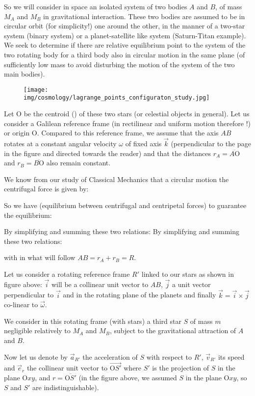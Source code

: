 	So we will consider in space an isolated system of two bodies $A$ and $B$, of mass $M_A$ and $M_B$ in gravitational interaction. These two bodies are assumed to be in circular orbit (for simplicity!) one around the other, in the manner of a two-star system (binary system) or a planet-satellite like system (Saturn-Titan example). We seek to determine if there are relative equilibrium point to the system of the two rotating body for  a third body also in circular motion in the same plane (of sufficiently low mass to avoid disturbing the motion of the system of the two main bodies).
	\begin{figure}[H]
		\centering
		\texttt{[image: img/cosmology/lagrange\_points\_configuraton\_study.jpg]}	
	\end{figure}
	Let O be the centroid () of these two stars (or celestial objects in general). Let us consider a Galilean reference frame (in rectilinear and uniform motion therefore !) or origin O. Compared to this reference frame, we assume that the axis $AB$ rotates at a constant angular velocity $\omega$ of fixed axis $\vec{k}$ (perpendicular to the page in the figure and directed towards the reader) and that the distances $r_A=\overline{A\text{O}}$ and $r_B=\overline{B\text{O}}$ also remain constant.
 
 We know from our study of Classical Mechanics that a circular motion the centrifugal force is given by:
	
	So we have (equilibrium between centrifugal and centripetal forces) to guarantee the equilibrium:
	
	By simplifying and summing these two relations:
	By simplifying and summing these two relations:
	
	with in what will follow $AB=r_A+r_B=R$.
	
	Let us consider a rotating reference frame $R'$ linked to our stars as shown in figure above: $\vec{i}$ will be a collinear unit vector to $AB$, $\vec{j}$ a unit vector perpendicular to $\vec{i}$ and in the rotating plane of the planets and finally $\vec{k}=\vec{i}\times\vec{j}$ co-linear to $\vec{\omega}$.

	We consider in this rotating frame (with stars) a third star $S$ of mass $m$ negligible relatively to $M_A$ and $M_B$, subject to the gravitational attraction of $A$ and $B$.

	Now let us denote by $\vec{a}_{R'}$ the acceleration of $S$ with respect to $R'$, $\vec{v}_{R'}$ its speed and $\vec{e}_r$ the collinear  unit vector to $\overrightarrow{\text{O}S'}$ where $S'$ is the projection of $S$ in the plane O$xy$, and $r=\overline{\text{O}S'}$ (in the figure above, we assumed $S$ in the plane O$xy$, so $S$ and $S'$ are indistinguishable).
	
